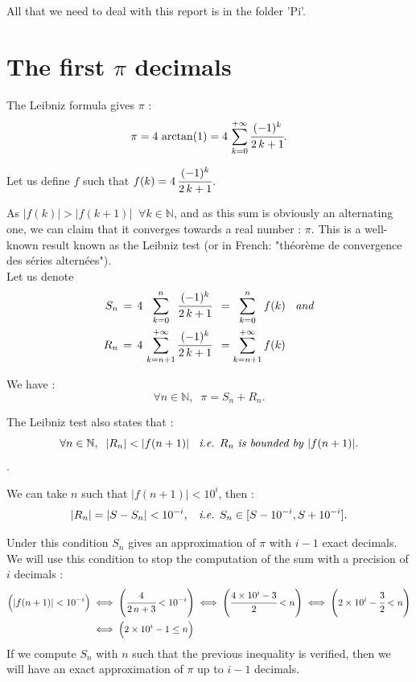 \documentclass[10pt]{article}
\title{\fbox{\begin{minipage}{1\textwidth}
\vspace{0,2cm}
\begin{center}
{\huge \textbf{\underline{Report :} Parallel computation of $\pi$ decimals}}
\end{center}
\end{minipage}}}
\author{Alexandre Temperville, Master 2 Scientific Computing}
\date{}
\begin{document}
\maketitle

All that we need to deal with this report is in the folder 'Pi'. 


\section*{The first $\pi$ decimals}


The Leibniz formula gives $\pi$ : $$\pi = 4\, \arctan(1) = 4\,\sum_{k=0}^{+\infty} \cfrac{(-1)^k}{2\,k+1}.$$

Let us define $f$ such that $f(k) = 4\,\cfrac{(-1)^k}{2\,k+1}$.

As $|f(k)| > |f(k + 1)| \;\;\forall k \in \mathbb{N}$, and as this sum is obviously an alternating one, we can claim that it converges towards a real number : $\pi$. This is a well-known result known as the Leibniz test (or in French: "th\'{e}or\`{e}me de convergence des s\'{e}ries altern\'{e}es"). \\

Let us denote
\begin{align*}
S_n \, &= \, 4\,\;\;\sum_{k=0}^{n}\;\; \cfrac{(-1)^k}{2\,k+1} \;\;= \;\;\sum_{k=0}^{n}\;\; f(k) \;\; \mbox{ \textit{and}} \\
R_n \, &= \,4\,\sum_{k=n+1}^{+\infty} \cfrac{(-1)^k}{2\,k+1} \;\;= \sum_{k=n+1}^{+\infty} f(k)
\end{align*}

We have : $$\forall n \in \mathbb{N},\;\; \pi = S_n + R_n.$$

The Leibniz test also states that : $$\forall n \in \mathbb{N}, \;\; |R_n| < |f(n + 1)| \;\; \mbox{ \textit{i.e.} } R_n \mbox{ \textit{is bounded by} } |f(n + 1)|.$$.

We can take $n$ such that $|f(n+1)| < 10^i$, then : $$|R_n| = |S - S_n| < 10^{-i}, \;\; \mbox{ \textit{i.e.} } S_n \in [S - 10^{-i}, S + 10^{-i}].$$ 

Under this condition $S_n$ gives an approximation of $\pi$ with $i-1$ exact decimals. We will use this condition to stop the computation of the sum with a precision of $i$ decimals :
\begin{align*}
\Big(|f(n + 1)| < 10^{-i}\Big) \; &\Longleftrightarrow \; \left(\cfrac{4}{2\,n+3} < 10^{-i}\right) \; \Longleftrightarrow \; \left(\cfrac{4\times 10^i-3}{2} < n\right) \; \Longleftrightarrow \; \left(2\times 10^i -\cfrac{3}{2} < n\right) \\
& \Longleftrightarrow \; \Big(2\times 10^i - 1 \leq n\Big)
\end{align*}
If we compute $S_n$ with $n$ such that the previous inequality is verified, then we will have an exact approximation of $\pi$ up to $i-1$ decimals. \\
\end{document}

